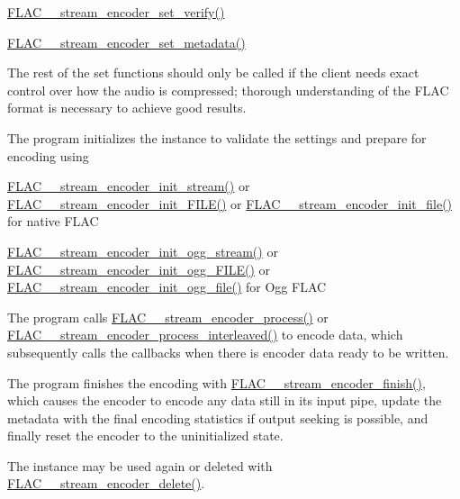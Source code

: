 \begin{DoxyItemize}
\begin{DoxyItemize}
\item \mbox{\hyperlink{group__flac__stream__encoder_ga5f4ac18a7207d2864fed72d284486f9e}{F\+L\+A\+C\+\_\+\+\_\+stream\+\_\+encoder\+\_\+set\+\_\+verify()}}
\item \mbox{\hyperlink{group__flac__stream__encoder_ga67b30b1a67a9274f7708a22154b225f6}{F\+L\+A\+C\+\_\+\+\_\+stream\+\_\+encoder\+\_\+set\+\_\+metadata()}}
\end{DoxyItemize}
\item The rest of the set functions should only be called if the client needs exact control over how the audio is compressed; thorough understanding of the F\+L\+AC format is necessary to achieve good results.
\item The program initializes the instance to validate the settings and prepare for encoding using
\begin{DoxyItemize}
\item \mbox{\hyperlink{group__flac__stream__encoder_ga85221c4ceb9f22dfd4983d8f07a9a35b}{F\+L\+A\+C\+\_\+\+\_\+stream\+\_\+encoder\+\_\+init\+\_\+stream()}} or \mbox{\hyperlink{group__flac__stream__encoder_ga78653fea5d9bc490fff34e3ef86de944}{F\+L\+A\+C\+\_\+\+\_\+stream\+\_\+encoder\+\_\+init\+\_\+\+F\+I\+L\+E()}} or \mbox{\hyperlink{group__flac__stream__encoder_ga693bb5ed30d912822e0e6c7c0404428c}{F\+L\+A\+C\+\_\+\+\_\+stream\+\_\+encoder\+\_\+init\+\_\+file()}} for native F\+L\+AC
\item \mbox{\hyperlink{group__flac__stream__encoder_ga87af71d74c09f7d482f9f420ef9bf826}{F\+L\+A\+C\+\_\+\+\_\+stream\+\_\+encoder\+\_\+init\+\_\+ogg\+\_\+stream()}} or \mbox{\hyperlink{group__flac__stream__encoder_gab44c7f51a61826e04abd8cdf5c1ceac2}{F\+L\+A\+C\+\_\+\+\_\+stream\+\_\+encoder\+\_\+init\+\_\+ogg\+\_\+\+F\+I\+L\+E()}} or \mbox{\hyperlink{group__flac__stream__encoder_ga51eb79f04e9a676cd1ce0c94729252e4}{F\+L\+A\+C\+\_\+\+\_\+stream\+\_\+encoder\+\_\+init\+\_\+ogg\+\_\+file()}} for Ogg F\+L\+AC
\end{DoxyItemize}
\item The program calls \mbox{\hyperlink{group__flac__stream__encoder_gae187ec4f6cab3ca109637996ee23272d}{F\+L\+A\+C\+\_\+\+\_\+stream\+\_\+encoder\+\_\+process()}} or \mbox{\hyperlink{group__flac__stream__encoder_ga67c2ff5b23b945180797de420b1f27c0}{F\+L\+A\+C\+\_\+\+\_\+stream\+\_\+encoder\+\_\+process\+\_\+interleaved()}} to encode data, which subsequently calls the callbacks when there is encoder data ready to be written.
\item The program finishes the encoding with \mbox{\hyperlink{group__flac__stream__encoder_gab2c1e5477c1e3fe9ad0d722ff8eecda2}{F\+L\+A\+C\+\_\+\+\_\+stream\+\_\+encoder\+\_\+finish()}}, which causes the encoder to encode any data still in its input pipe, update the metadata with the final encoding statistics if output seeking is possible, and finally reset the encoder to the uninitialized state.
\item The instance may be used again or deleted with \mbox{\hyperlink{group__flac__stream__encoder_ga9c9956af42bebe923da59437628aa9ea}{F\+L\+A\+C\+\_\+\+\_\+stream\+\_\+encoder\+\_\+delete()}}.
\end{DoxyItemize}

